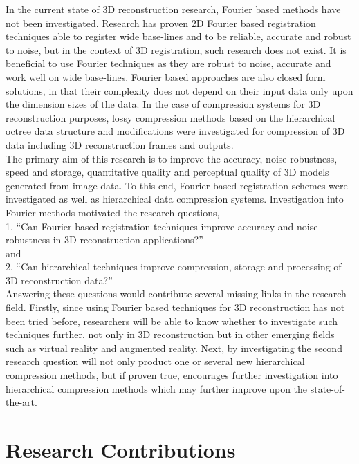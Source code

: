 In the current state of 3D reconstruction research, Fourier based methods have not been investigated. Research has proven 2D Fourier based registration techniques able to register wide base-lines and to be reliable, accurate and robust to noise, but in the context of 3D registration, such research does not exist. It is beneficial to use Fourier techniques as they are robust to noise, accurate and work well on wide base-lines. Fourier based approaches are also closed form solutions, in that their complexity does not depend on their input data only upon the dimension sizes of the data. In the case of compression systems for 3D reconstruction purposes, lossy compression methods based on the hierarchical octree data structure and modifications \cite{Lincoln13Interpolating} were investigated for compression of 3D data including 3D reconstruction frames and outputs. \\

The primary aim of this research is to improve the accuracy, noise robustness, speed and storage, quantitative quality and perceptual quality of 3D models generated from image data. To this end, Fourier based registration schemes were investigated as well as hierarchical data compression systems. Investigation into Fourier methods motivated the research questions, \\

1. ``Can Fourier based registration techniques improve accuracy and noise robustness in 3D reconstruction applications?'' \\

and \\

2. ``Can hierarchical techniques improve compression, storage and processing of 3D reconstruction data?'' \\

Answering these questions would contribute several missing links in the research field. Firstly, since using Fourier based techniques for 3D reconstruction has not been tried before, researchers will be able to know whether to investigate such techniques further, not only in 3D reconstruction but in other emerging fields such as virtual reality and augmented reality. Next, by investigating the second research question will not only product one or several new hierarchical compression methods, but if proven true, encourages further investigation into hierarchical compression methods which may further improve upon the state-of-the-art.

\section{Research Contributions}
\label{sec:INTO_RESEARCH_CONTRIBUTIONS}

